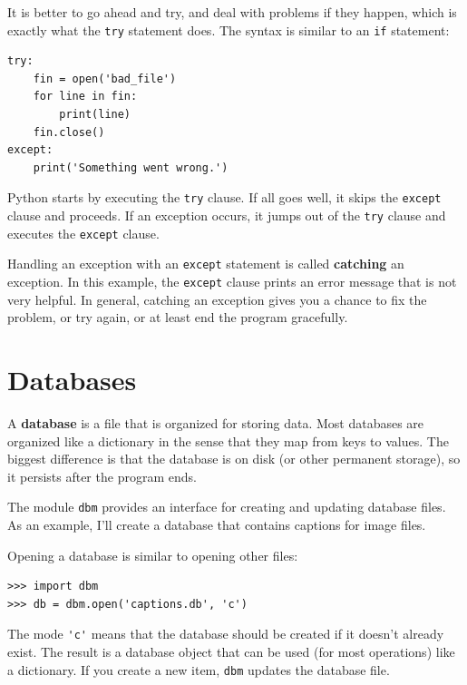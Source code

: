 \documentclass[10pt]{book}
\begin{document}

It is better to go ahead and try, and deal with problems if they
happen, which is exactly what the {\tt try} statement does.  The
syntax is similar to an {\tt if} statement:

\beforeverb
\begin{verbatim}
try:    
    fin = open('bad_file')
    for line in fin:
        print(line)
    fin.close()
except:
    print('Something went wrong.')
\end{verbatim}
\afterverb
%
Python starts by executing the {\tt try} clause.  If all goes
well, it skips the {\tt except} clause and proceeds.  If an
exception occurs, it jumps out of the {\tt try} clause and
executes the {\tt except} clause.

Handling an exception with an {\tt except} statement is called {\bf
catching} an exception.  In this example, the {\tt except} clause
prints an error message that is not very helpful.  In general,
catching an exception gives you a chance to fix the problem, or try
again, or at least end the program gracefully.


\section{Databases}


A {\bf database} is a file that is organized for storing data.
Most databases are organized like a dictionary in the sense
that they map from keys to values.  The biggest difference
is that the database is on disk (or other permanent storage),
so it persists after the program ends.


The module {\tt dbm} provides an interface for creating
and updating database files.  As an example, I'll create a database
that contains captions for image files.


Opening a database is similar
to opening other files:

\beforeverb
\begin{verbatim}
>>> import dbm
>>> db = dbm.open('captions.db', 'c')
\end{verbatim}
\afterverb
%
The mode \verb"'c'" means that the database should be created if
it doesn't already exist.  The result is a database object
that can be used (for most operations) like a dictionary.
If you create a new item, {\tt dbm} updates the database file.
\end{document}
